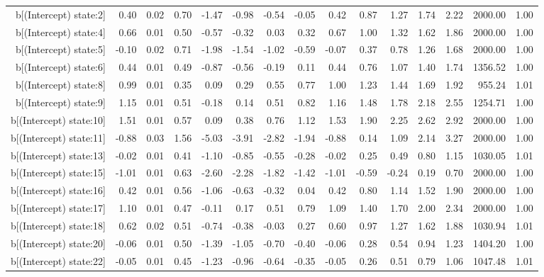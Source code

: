 \begin{table}[ht]
\begin{tabular}{rrrrrrrrrrrrrrr}
  b[(Intercept) state:2] & 0.40 & 0.02 & 0.70 & -1.47 & -0.98 & -0.54 & -0.05 & 0.42 & 0.87 & 1.27 & 1.74 & 2.22 & 2000.00 & 1.00 \\ 
  b[(Intercept) state:4] & 0.66 & 0.01 & 0.50 & -0.57 & -0.32 & 0.03 & 0.32 & 0.67 & 1.00 & 1.32 & 1.62 & 1.86 & 2000.00 & 1.00 \\ 
  b[(Intercept) state:5] & -0.10 & 0.02 & 0.71 & -1.98 & -1.54 & -1.02 & -0.59 & -0.07 & 0.37 & 0.78 & 1.26 & 1.68 & 2000.00 & 1.00 \\ 
  b[(Intercept) state:6] & 0.44 & 0.01 & 0.49 & -0.87 & -0.56 & -0.19 & 0.11 & 0.44 & 0.76 & 1.07 & 1.40 & 1.74 & 1356.52 & 1.00 \\ 
  b[(Intercept) state:8] & 0.99 & 0.01 & 0.35 & 0.09 & 0.29 & 0.55 & 0.77 & 1.00 & 1.23 & 1.44 & 1.69 & 1.92 & 955.24 & 1.01 \\ 
  b[(Intercept) state:9] & 1.15 & 0.01 & 0.51 & -0.18 & 0.14 & 0.51 & 0.82 & 1.16 & 1.48 & 1.78 & 2.18 & 2.55 & 1254.71 & 1.00 \\ 
  b[(Intercept) state:10] & 1.51 & 0.01 & 0.57 & 0.09 & 0.38 & 0.76 & 1.12 & 1.53 & 1.90 & 2.25 & 2.62 & 2.92 & 2000.00 & 1.00 \\ 
  b[(Intercept) state:11] & -0.88 & 0.03 & 1.56 & -5.03 & -3.91 & -2.82 & -1.94 & -0.88 & 0.14 & 1.09 & 2.14 & 3.27 & 2000.00 & 1.00 \\ 
  b[(Intercept) state:13] & -0.02 & 0.01 & 0.41 & -1.10 & -0.85 & -0.55 & -0.28 & -0.02 & 0.25 & 0.49 & 0.80 & 1.15 & 1030.05 & 1.01 \\ 
  b[(Intercept) state:15] & -1.01 & 0.01 & 0.63 & -2.60 & -2.28 & -1.82 & -1.42 & -1.01 & -0.59 & -0.24 & 0.19 & 0.70 & 2000.00 & 1.00 \\ 
  b[(Intercept) state:16] & 0.42 & 0.01 & 0.56 & -1.06 & -0.63 & -0.32 & 0.04 & 0.42 & 0.80 & 1.14 & 1.52 & 1.90 & 2000.00 & 1.00 \\ 
  b[(Intercept) state:17] & 1.10 & 0.01 & 0.47 & -0.11 & 0.17 & 0.51 & 0.79 & 1.09 & 1.40 & 1.70 & 2.00 & 2.34 & 2000.00 & 1.00 \\ 
  b[(Intercept) state:18] & 0.62 & 0.02 & 0.51 & -0.74 & -0.38 & -0.03 & 0.27 & 0.60 & 0.97 & 1.27 & 1.62 & 1.88 & 1030.94 & 1.01 \\ 
  b[(Intercept) state:20] & -0.06 & 0.01 & 0.50 & -1.39 & -1.05 & -0.70 & -0.40 & -0.06 & 0.28 & 0.54 & 0.94 & 1.23 & 1404.20 & 1.00 \\ 
  b[(Intercept) state:22] & -0.05 & 0.01 & 0.45 & -1.23 & -0.96 & -0.64 & -0.35 & -0.05 & 0.26 & 0.51 & 0.79 & 1.06 & 1047.48 & 1.01 \\ 

\end{tabular}
\end{table}
